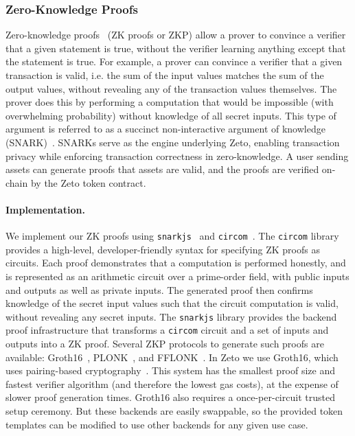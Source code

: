 \subsubsection{Zero-Knowledge Proofs}

Zero-knowledge proofs~\cite{TODO} (ZK proofs or ZKP) allow a prover to convince a verifier that a given statement is true, without the verifier learning anything except that the statement is true. For example, a prover can convince a verifier that a given transaction is valid, i.e. the sum of the input values matches the sum of the output values, without revealing any of the transaction values themselves. The prover does this by performing a computation that would be impossible (with overwhelming probability) without knowledge of all secret inputs. This type of argument is referred to as a succinct non-interactive argument of knowledge (SNARK)~\cite{TODO}. SNARKs serve as the engine underlying Zeto, enabling transaction privacy while enforcing transaction correctness in zero-knowledge. A user sending assets can generate proofs that assets are valid, and the proofs are verified on-chain by the Zeto token contract.

\paragraph{Implementation.} We implement our ZK proofs using \texttt{snarkjs}~\cite{TODO} and \texttt{circom}~\cite{TODO}. The \texttt{circom} library provides a high-level, developer-friendly syntax for specifying ZK proofs as circuits. Each proof demonstrates that a computation is performed honestly, and is represented as an arithmetic circuit over a prime-order field, with public inputs and outputs as well as private inputs. The generated proof then confirms knowledge of the secret input values such that the circuit computation is valid, without revealing any secret inputs. The \texttt{snarkjs} library provides the backend proof infrastructure that transforms a \texttt{circom} circuit and a set of inputs and outputs into a ZK proof. Several ZKP protocols to generate such proofs are available: Groth16~\cite{TODO}, PLONK~\cite{TODO}, and FFLONK~\cite{TODO}. In Zeto we use Groth16, which uses pairing-based cryptography~\cite{TODO}. This system has the smallest proof size and fastest verifier algorithm (and therefore the lowest gas costs), at the expense of slower proof generation times. Groth16 also requires a once-per-circuit trusted setup ceremony. But these backends are easily swappable, so the provided token templates can be modified to use other backends for any given use case.


